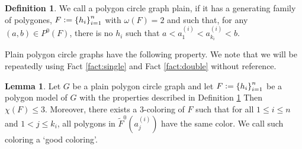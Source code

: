 \documentclass[12pt]{article}
\theoremstyle{definition}
\newtheorem{lemma}[thm]{Lemma}
\newtheorem{defn}[thm]{Definition}
\newcommand{\defeq}{\vcentcolon=}
\begin{document}
     \begin{defn} \label{def:plain}
         We call a polygon
         circle graph plain,
         if it has a generating
         family of polygones,
         $F \defeq \left\{h_{i}\right\}_{i = 1}^{n}$ 
         with $\omega\left(F\right) = 2$
         and such that, 
         for any 
         $\left(a, b\right) \in 
         P^{0}\left(F\right)$,
         there is no $h_{i}$ 
         such that
         $a < a_1^{\left(i\right)} < 
         a_{k_{i}}^{\left(i\right)} <
         b$.
     \end{defn}

     Plain polygon
     circle graphs have the
     following property. 
     We note that we will
     be repeatedly using
     Fact \ref{fact:single}
     and Fact \ref{fact:double}
     without reference.

     \begin{lemma} \label{lemma:poly}
         Let $G$ be a plain polygon
         circle graph and
         let $F \defeq \left\{h_{i}\right\}_{i =1}^{n}$ 
         be a polygon model of $G$ with
         the properties
         described in Definition
         \ref{def:plain}
         Then $\chi\left(F\right) \leq 3$.
         Moreover, there exists
         a 3-coloring of $F$ such
         that for all $1 \leq i \leq n$
         and $1 < j \leq k_{i}$,
         all polygons in
         $\widetilde{F}^{0}\left(a_{j}^{\left(i\right)}\right)$
         have the same color.
         We call such coloring a
         `good coloring'.
     \end{lemma}
\end{document}
